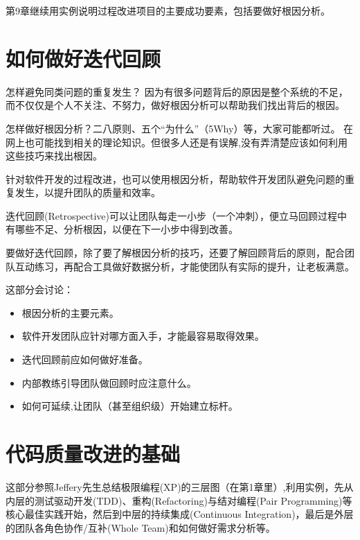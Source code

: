 \documentclass{book}        %
\providecommand{\tightlist}{%
  \setlength{\itemsep}{0pt}\setlength{\parskip}{0pt}}
\begin{document}
第9章继续用实例说明过程改进项目的主要成功要素，包括要做好根因分析。 





\part{如何做好迭代回顾}怎样避免同类问题的重复发生？ 因为有很多问题背后的原因是整个系统的不足， 而不仅仅是个人不关注、不努力，做好根因分析可以帮助我们找出背后的根因。

怎样做好根因分析？二八原则、五个“为什么”（5Why）等，大家可能都听过。 在网上也可能找到相关的理论知识。但很多人还是有误解,没有弄清楚应该如何利用这些技巧来找出根因。

针对软件开发的过程改进，也可以使用根因分析，帮助软件开发团队避免问题的重复发生，以提升团队的质量和效率。

迭代回顾(Retrospective)可以让团队每走一小步（一个冲刺），便立马回顾过程中有哪些不足、分析根因，以便在下一小步中得到改善。

要做好迭代回顾，除了要了解根因分析的技巧，还要了解回顾背后的原则，配合团队互动练习，再配合工具做好数据分析，才能使团队有实际的提升，让老板满意。

这部分会讨论：

\begin{itemize}
\tightlist
\item
  根因分析的主要元素。
\item
  软件开发团队应针对哪方面入手，才能最容易取得效果。
\item
  迭代回顾前应如何做好准备。
\item
  内部教练引导团队做回顾时应注意什么。
\item
  如何可延续,让团队（甚至组织级）开始建立标杆。
\end{itemize}





\part{代码质量改进的基础}这部分参照Jeffery先生总结极限编程(XP)的三层图（在第1章里）,利用实例，先从内层的测试驱动开发(TDD)、重构(Refactoring)与结对编程(Pair Programming)等核心最佳实践开始，然后到中层的持续集成(Continuous Integration)，最后是外层的团队各角色协作/互补(Whole Team)和如何做好需求分析等。
\end{document}
